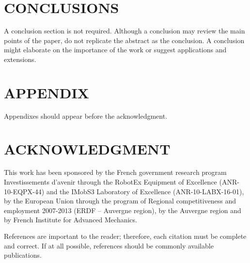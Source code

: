 \documentclass[letterpaper, 10 pt, conference]{ieeeconf}  %
\begin{document}
\section{CONCLUSIONS}

A conclusion section is not required. Although a conclusion may review the main points of the paper, do not replicate the abstract as the conclusion. A conclusion might elaborate on the importance of the work or suggest applications and extensions. 

\addtolength{\textheight}{-12cm}   %







\section*{APPENDIX}

Appendixes should appear before the acknowledgment.

\section*{ACKNOWLEDGMENT}

This work has been sponsored by the French government research program Investissements d'avenir through the RobotEx Equipment of Excellence (ANR-10-EQPX-44) and the IMobS3 Laboratory of Excellence (ANR-10-LABX-16-01), by the European Union through the program of Regional competitiveness and employment 2007-2013 (ERDF – Auvergne region), by the Auvergne region and by French Institute for Advanced Mechanics. 





References are important to the reader; therefore, each citation must be complete and correct. If at all possible, references should be commonly available publications.









\end{document}
